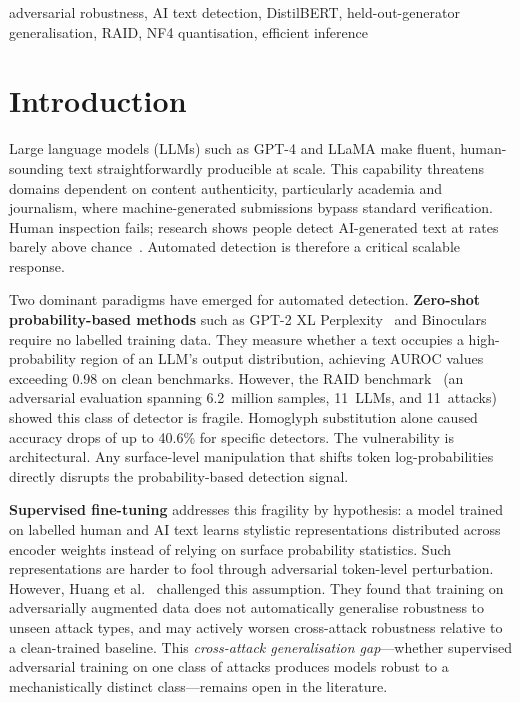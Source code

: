 \documentclass[conference]{IEEEtran}
\begin{document}
\begin{IEEEkeywords}
adversarial robustness, AI text detection, DistilBERT, held-out-generator
generalisation, RAID, NF4 quantisation, efficient inference
\end{IEEEkeywords}

\section{Introduction}\label{sec:intro}

Large language models (LLMs) such as GPT-4 and LLaMA make fluent, human-sounding
text straightforwardly producible at scale. This capability threatens domains dependent
on content authenticity, particularly academia and journalism, where machine-generated
submissions bypass standard verification. Human inspection fails; research shows
people detect AI-generated text at rates barely above chance~\cite{ippolito2020}.
Automated detection is therefore a critical scalable response.

Two dominant paradigms have emerged for automated detection.
\textbf{Zero-shot probability-based methods} such as GPT-2 XL Perplexity~\cite{bao2024}
and Binoculars~\cite{hans2024} require no labelled training data. They measure
whether a text occupies a high-probability region of an LLM's output distribution,
achieving AUROC values exceeding 0.98 on clean benchmarks. However, the RAID
benchmark~\cite{dugan2024} (an adversarial evaluation spanning 6.2~million samples,
11~LLMs, and 11~attacks) showed this class of detector is fragile. Homoglyph
substitution alone caused accuracy drops of up to 40.6\% for specific detectors.
The vulnerability is architectural. Any surface-level manipulation that shifts
token log-probabilities directly disrupts the probability-based detection signal.

\textbf{Supervised fine-tuning} addresses this fragility by hypothesis: a
model trained on labelled human and AI text learns stylistic representations
distributed across encoder weights instead of relying on surface probability
statistics. Such representations are harder to fool through adversarial
token-level perturbation. However, Huang et al.~\cite{huang2024} challenged
this assumption. They found that training on adversarially augmented data does
not automatically generalise robustness to unseen attack types, and may actively
worsen cross-attack robustness relative to a clean-trained baseline. This
\emph{cross-attack generalisation gap}---whether supervised adversarial training
on one class of attacks produces models robust to a mechanistically distinct
class---remains open in the literature.
\end{document}
